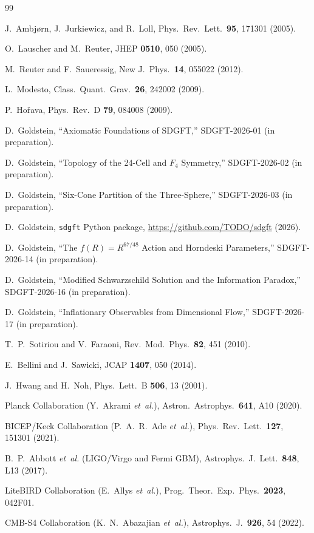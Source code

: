 \documentclass[amsmath,amssymb,aps,prd,twocolumn,superscriptaddress,nofootinbib]{revtex4-2}
\begin{document}
\begin{thebibliography}{99}

J.~Ambj{\o}rn, J.~Jurkiewicz, and R.~Loll,
Phys.\ Rev.\ Lett.\ \textbf{95}, 171301 (2005).

O.~Lauscher and M.~Reuter,
JHEP \textbf{0510}, 050 (2005).

M.~Reuter and F.~Saueressig,
New J.\ Phys.\ \textbf{14}, 055022 (2012).

L.~Modesto,
Class.\ Quant.\ Grav.\ \textbf{26}, 242002 (2009).

P.~Ho{\v r}ava,
Phys.\ Rev.\ D \textbf{79}, 084008 (2009).

D.~Goldstein, ``Axiomatic Foundations of SDGFT,''
SDGFT-2026-01 (in preparation).

D.~Goldstein, ``Topology of the 24-Cell and $F_4$ Symmetry,''
SDGFT-2026-02 (in preparation).

D.~Goldstein, ``Six-Cone Partition of the Three-Sphere,''
SDGFT-2026-03 (in preparation).

D.~Goldstein, \texttt{sdgft} Python package,
\url{https://github.com/TODO/sdgft} (2026).

D.~Goldstein, ``The $f(R) = R^{67/48}$ Action and Horndeski
Parameters,'' SDGFT-2026-14 (in preparation).

D.~Goldstein, ``Modified Schwarzschild Solution and the
Information Paradox,'' SDGFT-2026-16 (in preparation).

D.~Goldstein, ``Inflationary Observables from Dimensional Flow,''
SDGFT-2026-17 (in preparation).

T.~P.~Sotiriou and V.~Faraoni,
Rev.\ Mod.\ Phys.\ \textbf{82}, 451 (2010).

E.~Bellini and J.~Sawicki,
JCAP \textbf{1407}, 050 (2014).

J.~Hwang and H.~Noh,
Phys.\ Lett.\ B \textbf{506}, 13 (2001).

Planck Collaboration (Y.~Akrami \textit{et~al.}),
Astron.\ Astrophys.\ \textbf{641}, A10 (2020).

BICEP/Keck Collaboration (P.~A.~R.~Ade \textit{et~al.}),
Phys.\ Rev.\ Lett.\ \textbf{127}, 151301 (2021).

B.~P.~Abbott \textit{et~al.} (LIGO/Virgo and Fermi GBM),
Astrophys.\ J.\ Lett.\ \textbf{848}, L13 (2017).

LiteBIRD Collaboration (E.~Allys \textit{et~al.}),
Prog.\ Theor.\ Exp.\ Phys.\ \textbf{2023}, 042F01.

CMB-S4 Collaboration (K.~N.~Abazajian \textit{et~al.}),
Astrophys.\ J.\ \textbf{926}, 54 (2022).

\end{thebibliography}
\end{document}
